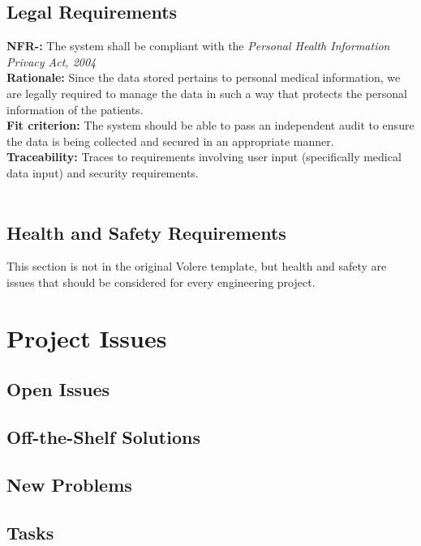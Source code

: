 \documentclass[12pt, titlepage]{article}
\newcounter{NFR_Counter}
\newcounter{FR_Counter}
\begin{document}
\subsection{Legal Requirements}
\noindent\textbf{NFR-\the\value{NFR_Counter}:}
The system shall be compliant with the \textit{Personal Health Information Privacy Act, 2004}  \\
\textbf{Rationale:}
Since the data stored pertains to personal medical information, we are legally required to manage the data in such a way that protects the personal information of the patients. \\
\textbf{Fit criterion:}
The system should be able to pass an independent audit to ensure the data is being collected and secured in an appropriate manner. \\
\textbf{Traceability:}
Traces to requirements involving user input (specifically medical data input) and security requirements. \\~\\
\addtocounter{NFR_Counter}{1}


\subsection{Health and Safety Requirements}

This section is not in the original Volere template, but health and safety are
issues that should be considered for every engineering project.

\section{Project Issues}

\subsection{Open Issues}

\subsection{Off-the-Shelf Solutions}

\subsection{New Problems}

\subsection{Tasks}
\end{document}
